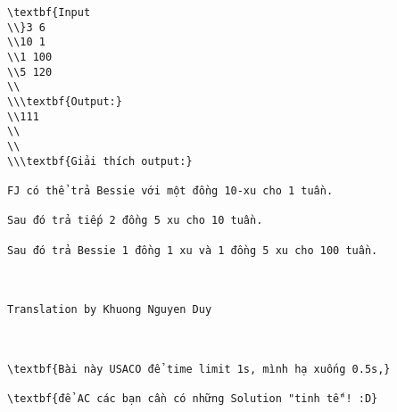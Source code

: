 \begin{verbatim}
\textbf{Input
\\}3 6
\\10 1
\\1 100
\\5 120
\\
\\\textbf{Output:}
\\111
\\
\\
\\\textbf{Giải thích output:}

FJ có thể trả Bessie với một đồng 10-xu cho 1 tuần.

Sau đó trả tiếp 2 đồng 5 xu cho 10 tuần.

Sau đó trả Bessie 1 đồng 1 xu và 1 đồng 5 xu cho 100 tuần.

 

Translation by Khuong Nguyen Duy

 

\textbf{Bài này USACO để time limit 1s, mình hạ xuống 0.5s,}

\textbf{để AC các bạn cần có những Solution "tinh tế"! :D}\end{verbatim}